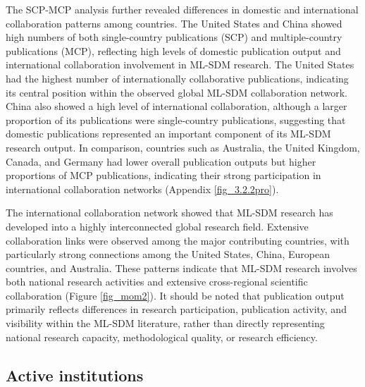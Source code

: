 \documentclass[authoryear,preprint,review,12pt]{elsarticle}
\begin{document}
The SCP-MCP analysis further revealed differences in domestic and international collaboration patterns among countries. The United States and China showed high numbers of both single-country publications (SCP) and multiple-country publications (MCP), reflecting high levels of domestic publication output and international collaboration involvement in ML-SDM research. The United States had the highest number of internationally collaborative publications, indicating its central position within the observed global ML-SDM collaboration network. China also showed a high level of international collaboration, although a larger proportion of its publications were single-country publications, suggesting that domestic publications represented an important component of its ML-SDM research output. In comparison, countries such as Australia, the United Kingdom, Canada, and Germany had lower overall publication outputs but higher proportions of MCP publications, indicating their strong participation in international collaboration networks (Appendix \ref{fig_3.2.2pro}).

The international collaboration network showed that ML-SDM research has developed into a highly interconnected global research field. Extensive collaboration links were observed among the major contributing countries, with particularly strong connections among the United States, China, European countries, and Australia. These patterns indicate that ML-SDM research involves both national research activities and extensive cross-regional scientific collaboration (Figure \ref{fig_mom2}). It should be noted that publication output primarily reflects differences in research participation, publication activity, and visibility within the ML-SDM literature, rather than directly representing national research capacity, methodological quality, or research efficiency.

\subsection{Active institutions}
\end{document}
